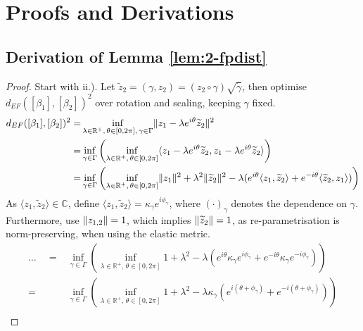 \label{app:a}

\section{Proofs and Derivations}
\label{app:a-deriv}

\subsection{Derivation of Lemma \ref{lem:2-fpdist}}
\label{app:a-deriv-fpdist}
\begin{proof}
  Start with ii.).
  Let $\widetilde z_2 = (\gamma, z_2) = (z_2 \circ \gamma) \sqrt{\dot\gamma}$, then optimise $d_{EF}([\beta_1],[\beta_2])^2$ over rotation and scaling, keeping $\gamma$ fixed.
  \begin{align*}
    d_{EF}([\beta_1],[\beta_2])^2 
      = & \inf_{\lambda \in \mathbb{R}^+,\, \theta \in [0,2\pi],\, \gamma \in \Gamma} \lVert z_1 - \lambda e^{i\theta} \widetilde z_2\rVert^2 \\
      = & \inf_{\gamma \in \Gamma} \left( \inf_{\lambda \in \mathbb{R}^+,\, \theta \in [0,2\pi]} \langle z_1 - \lambda e^{i\theta} \widetilde z_2, z_1 - \lambda e^{i\theta} \widetilde z_2 \rangle \right) \\
      = & \inf_{\gamma \in \Gamma} \left( \inf_{\lambda \in \mathbb{R}^+,\, \theta \in [0,2\pi]} \lVert z_1\rVert^2 + \lambda^2 \lVert\widetilde z_2\rVert^2 - \lambda ( e^{i\theta} \langle z_1, \widetilde z_2 \rangle + e^{-i\theta} \langle \widetilde z_2, z_1 \rangle ) \right) 
  \end{align*}
  As $\langle z_1, \widetilde z_2 \rangle \in \mathbb{C}$, define $\langle z_1, \widetilde z_2 \rangle = \kappa_\gamma e^{i\phi_\gamma}$, where $(\cdot)_\gamma$ denotes the dependence on $\gamma$. Furthermore, use $\lVert z_{1,2}\rVert = 1$, which implies $\lVert\widetilde z_2\rVert = 1$, as re-parametrisation is norm-preserving, when using the elastic metric.
  \begin{align*}
    \dots\quad
     = & \inf_{\gamma \in \Gamma} \left( \inf_{\lambda \in \mathbb{R}^+,\, \theta \in [0,2\pi]} 1 + \lambda^2  - \lambda ( e^{i\theta} \kappa_\gamma e^{i\phi_\gamma} + e^{-i\theta} \kappa_\gamma e^{-i\phi_\gamma} ) \right) \\
     = & \inf_{\gamma \in \Gamma} \left( \inf_{\lambda \in \mathbb{R}^+,\, \theta \in [0,2\pi]} 1 + \lambda^2  - \lambda \kappa_\gamma \left( e^{i(\theta + \phi_\gamma)} + e^{-i (\theta + \phi_\gamma)} \right) \right) \\

\end{align*}
\end{proof}
